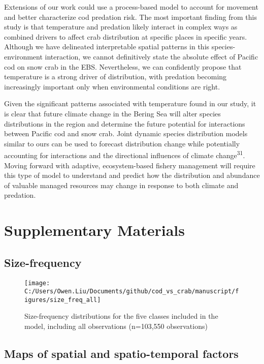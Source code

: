 \documentclass[11pt,]{article}
\begin{document}
Extensions of our work could use a process-based model to account for movement and better characterize cod predation risk. The most important finding from this study is that temperature and predation likely interact in complex ways as combined drivers to affect crab distribution at specific places in specific years. Although we have delineated interpretable spatial patterns in this species-environment interaction, we cannot definitively state the absolute effect of Pacific cod on snow crab in the EBS. Nevertheless, we can confidently propose that temperature is a strong driver of distribution, with predation becoming increasingly important only when environmental conditions are right.

Given the significant patterns associated with temperature found in our study, it is clear that future climate change in the Bering Sea will alter species distributions in the region and determine the future potential for interactions between Pacific cod and snow crab. Joint dynamic species distribution models similar to ours can be used to forecast distribution change while potentially accounting for interactions and the directional influences of climate change\textsuperscript{31}. Moving forward with adaptive, ecosystem-based fishery management will require this type of model to understand and predict how the distribution and abundance of valuable managed resources may change in response to both climate and predation.

\hypertarget{supplementary-materials}{%
\section{Supplementary Materials}\label{supplementary-materials}}

\hypertarget{size-frequency}{%
\subsection{Size-frequency}\label{size-frequency}}

\begin{figure}
\texttt{[image: C:/Users/Owen.Liu/Documents/github/cod\_vs\_crab/manuscript/figures/size\_freq\_all]} \caption{Size-frequency distributions for the five classes included in the model, including all observations (n=103,550 observations)}\label{fig:sfreq}
\end{figure}

\hypertarget{maps-of-spatial-and-spatio-temporal-factors}{%
\subsection{Maps of spatial and spatio-temporal factors}\label{maps-of-spatial-and-spatio-temporal-factors}}
\end{document}
